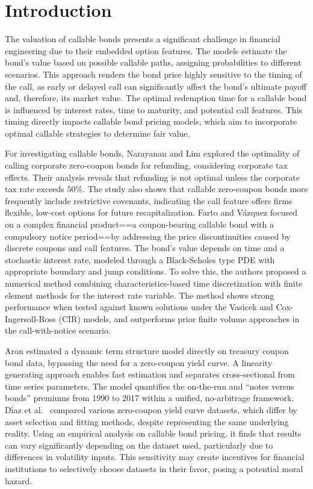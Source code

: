 \documentclass[10pt,a4paper]{amsart}
\numberwithin{equation}{section}
\begin{document}
\section{Introduction}

The valuation of callable bonds presents a significant challenge in financial 
engineering due to their embedded option features. The models estimate the bond's 
value based on possible callable paths, assigning probabilities to different scenarios. 
This approach renders the bond price highly sensitive to the timing of the call, 
as early or delayed call can significantly affect the bond's ultimate payoff and, 
therefore, its market value.
The optimal redemption time for a callable bond is influenced by interest rates, 
time to maturity, and potential call features. This timing directly impacts callable 
bond pricing models, which aim to incorporate optimal callable strategies to determine 
fair value.

For investigating callable bonds, Narayanan and Lim \cite{narayanan1989call} explored 
the optimality of calling corporate zero-coupon bonds for refunding, considering 
corporate tax effects. Their analysis reveals that refunding is not optimal unless the 
corporate tax rate exceeds $50\%$. The study also shows that callable zero-coupon bonds 
more frequently include restrictive covenants, indicating the call feature offers firms 
flexible, low-cost options for future recapitalization.
Farto and V\'azquez \cite{farto2005numerical} focused on a complex financial 
product==a coupon-bearing callable bond with a compulsory notice period==by 
addressing the price discontinuities caused by discrete coupons and call features. 
The bond's value depends on time and a stochastic interest rate, modeled through a
Black-Scholes type PDE with appropriate boundary and jump conditions. 
To solve this, the authors proposed a numerical method combining characteristics-based 
time discretization with finite element methods for the interest rate variable. 
The method shows strong performance when tested against known solutions under the 
Vasicek and Cox-Ingersoll-Ross (CIR) models, and outperforms prior finite volume 
approaches in the call-with-notice scenario.

Aron \cite{aaron2021zero} estimated a dynamic term structure model directly on treasury 
coupon bond data, bypassing the need for a zero-coupon yield curve. 
A linearity generating approach enables fast estimation and separates cross-sectional 
from time series parameters. The model quantifies the on-the-run and “notes versus 
bonds” premiums from 1990 to 2017 within a unified, no-arbitrage framework.
D{\'\i}az et al.\ \cite{diaz2022yield} compared various zero-coupon yield curve datasets,
which differ by asset selection and fitting methods, despite representing the same 
underlying reality. Using an empirical analysis on callable bond pricing, 
it finds that results can vary significantly depending on the dataset used, 
particularly due to differences in volatility inputs. This sensitivity may create 
incentives for financial institutions to selectively choose datasets in their favor, 
posing a potential moral hazard.
\end{document}
